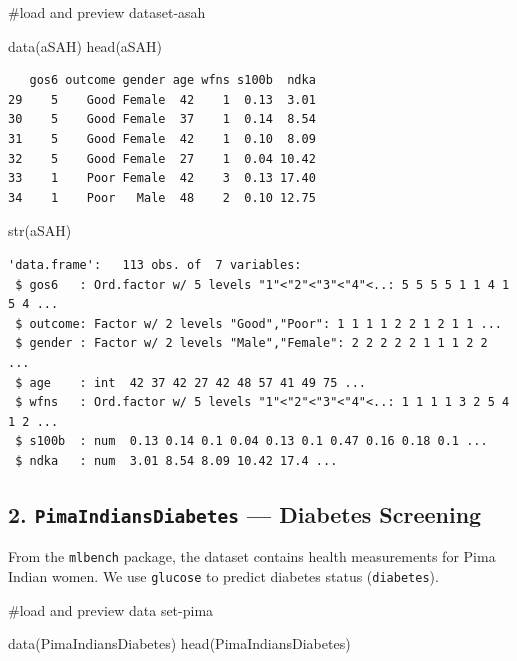 \documentclass[
  letterpaper,
  DIV=11,
  numbers=noendperiod]{scrreprt}
\newenvironment{Shaded}{\begin{snugshade}}{\end{snugshade}}
\newcommand{\CommentTok}[1]{\textcolor[rgb]{0.37,0.37,0.37}{#1}}
\newcommand{\FunctionTok}[1]{\textcolor[rgb]{0.28,0.35,0.67}{#1}}
\newcommand{\NormalTok}[1]{\textcolor[rgb]{0.00,0.23,0.31}{#1}}
\begin{document}
\begin{Shaded}
\begin{Highlighting}[]
\CommentTok{\#load and preview dataset{-}asah}

\FunctionTok{data}\NormalTok{(aSAH)}
\FunctionTok{head}\NormalTok{(aSAH)}
\end{Highlighting}
\end{Shaded}

\begin{verbatim}
   gos6 outcome gender age wfns s100b  ndka
29    5    Good Female  42    1  0.13  3.01
30    5    Good Female  37    1  0.14  8.54
31    5    Good Female  42    1  0.10  8.09
32    5    Good Female  27    1  0.04 10.42
33    1    Poor Female  42    3  0.13 17.40
34    1    Poor   Male  48    2  0.10 12.75
\end{verbatim}

\begin{Shaded}
\begin{Highlighting}[]
\FunctionTok{str}\NormalTok{(aSAH)}
\end{Highlighting}
\end{Shaded}

\begin{verbatim}
'data.frame':   113 obs. of  7 variables:
 $ gos6   : Ord.factor w/ 5 levels "1"<"2"<"3"<"4"<..: 5 5 5 5 1 1 4 1 5 4 ...
 $ outcome: Factor w/ 2 levels "Good","Poor": 1 1 1 1 2 2 1 2 1 1 ...
 $ gender : Factor w/ 2 levels "Male","Female": 2 2 2 2 2 1 1 1 2 2 ...
 $ age    : int  42 37 42 27 42 48 57 41 49 75 ...
 $ wfns   : Ord.factor w/ 5 levels "1"<"2"<"3"<"4"<..: 1 1 1 1 3 2 5 4 1 2 ...
 $ s100b  : num  0.13 0.14 0.1 0.04 0.13 0.1 0.47 0.16 0.18 0.1 ...
 $ ndka   : num  3.01 8.54 8.09 10.42 17.4 ...
\end{verbatim}

\subsection{\texorpdfstring{2. \texttt{PimaIndiansDiabetes} --- Diabetes
Screening}{2. PimaIndiansDiabetes --- Diabetes Screening}}\label{pimaindiansdiabetes-diabetes-screening}

From the \texttt{mlbench} package, the dataset contains health
measurements for Pima Indian women. We use \texttt{glucose} to predict
diabetes status (\texttt{diabetes}).

\begin{Shaded}
\begin{Highlighting}[]
\CommentTok{\#load and preview data set{-}pima}

\FunctionTok{data}\NormalTok{(PimaIndiansDiabetes)}
\FunctionTok{head}\NormalTok{(PimaIndiansDiabetes)}
\end{Highlighting}
\end{Shaded}
\end{document}
